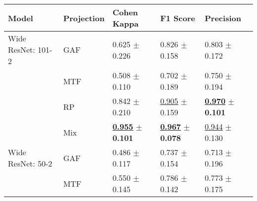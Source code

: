 
\begin{tabular}{lllll}
\toprule
Model & Projection & Cohen Kappa & F1 Score & Precision \\
\midrule
Wide ResNet: 101-2 & GAF & \textcolor[rgb]{0.7035040431,0.2964959569,0}{0.625} $\pm$ \textcolor[rgb]{1.0000000000,0.0000000000,0}{0.226} & \textcolor[rgb]{0.5310457516,0.4689542484,0}{0.826} $\pm$ \textcolor[rgb]{0.7216724410,0.2783275590,0}{0.158} & \textcolor[rgb]{0.6491803279,0.3508196721,0}{0.803} $\pm$ \textcolor[rgb]{0.7480801390,0.2519198610,0}{0.172} \\
 & MTF & \textcolor[rgb]{0.9525606469,0.0474393531,0}{0.508} $\pm$ \textcolor[rgb]{0.0744771966,0.5000000000,0}{0.110} & \textcolor[rgb]{1.0000000000,0.0000000000,0}{0.702} $\pm$ \textcolor[rgb]{1.0000000000,0.0000000000,0}{0.189} & \textcolor[rgb]{0.8557377049,0.1442622951,0}{0.750} $\pm$ \textcolor[rgb]{0.9761302963,0.0238697037,0}{0.194} \\
 & RP & \textcolor[rgb]{0.2409703504,0.5000000000,0}{0.842} $\pm$ \textcolor[rgb]{0.8693186823,0.1306813177,0}{0.210} & \underline{\textcolor[rgb]{0.2320261438,0.5000000000,0}{0.905}} $\pm$ \textcolor[rgb]{0.7291922402,0.2708077598,0}{0.159} & \underline{\textbf{\textcolor[rgb]{0.0000000000,0.5000000000,0}{0.970}}} $\pm$ \textbf{\textcolor[rgb]{0.0000000000,0.5000000000,0}{0.101}} \\
 & Mix & \underline{\textbf{\textcolor[rgb]{0.0000000000,0.5000000000,0}{0.955}}} $\pm$ \textbf{\textcolor[rgb]{0.0000000000,0.5000000000,0}{0.101}} & \underline{\textbf{\textcolor[rgb]{0.0000000000,0.5000000000,0}{0.967}}} $\pm$ \textbf{\textcolor[rgb]{0.0000000000,0.5000000000,0}{0.078}} & \underline{\textcolor[rgb]{0.0983606557,0.5000000000,0}{0.944}} $\pm$ \textcolor[rgb]{0.3064880551,0.5000000000,0}{0.130} \\
Wide ResNet: 50-2 & GAF & \textcolor[rgb]{1.0000000000,0.0000000000,0}{0.486} $\pm$ \textcolor[rgb]{0.1265958779,0.5000000000,0}{0.117} & \textcolor[rgb]{0.8687363834,0.1312636166,0}{0.737} $\pm$ \textcolor[rgb]{0.6890640385,0.3109359615,0}{0.154} & \textcolor[rgb]{1.0000000000,0.0000000000,0}{0.713} $\pm$ \textcolor[rgb]{1.0000000000,0.0000000000,0}{0.196} \\
 & MTF & \textcolor[rgb]{0.8636118598,0.1363881402,0}{0.550} $\pm$ \textcolor[rgb]{0.3477484360,0.5000000000,0}{0.145} & \textcolor[rgb]{0.6830065359,0.3169934641,0}{0.786} $\pm$ \textcolor[rgb]{0.5762344811,0.4237655189,0}{0.142} & \textcolor[rgb]{0.7672131148,0.2327868852,0}{0.773} $\pm$ \textcolor[rgb]{0.7823941516,0.2176058484,0}{0.175} \\

\end{tabular}
